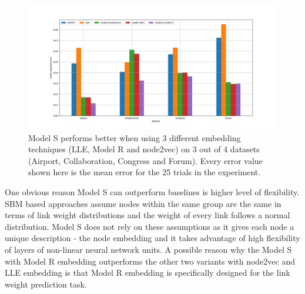 \documentclass[12pt]{WSUThesis}
\theoremstyle{definition}
\begin{document}
\begin{figure}[ht] \centering
	\includegraphics[width=1\linewidth]{weight-errors}
	\caption{
		Model S performs better when using 3 different embedding techniques (LLE, Model R and node2vec) on 3 out of 4 datasets (Airport, Collaboration, Congress and Forum).
		Every error value shown here is the mean error for the 25 trials in the experiment.
	}
	\label{fig:weight-errors}
\end{figure}
One obvious reason Model S can outperform baselines is higher level of flexibility.
SBM based approaches assume nodes within the same group are the same in terms of link weight distributions and the weight of every link follows a normal distribution.
Model S does not rely on these assumptions as it gives each node a unique description - the node embedding and it takes advantage of high flexibility of
layers of non-linear neural network units.
A possible reason why the Model S with Model R embedding outperforms the other two variants with node2vec and LLE embedding is that Model R embedding is specifically designed for the link weight prediction task.
\end{document}
